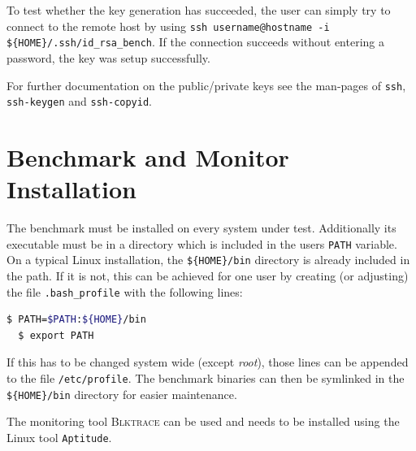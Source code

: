 To test whether the key generation has succeeded, the user can simply try to
connect to the remote host by using \texttt{ssh username@hostname -i \$\{HOME\}/.ssh/id\_rsa\_bench}. If the connection
succeeds without entering a password, the key was setup successfully.

For further documentation on the public/private keys see the man-pages of
\texttt{ssh}, \texttt{ssh-keygen} and \texttt{ssh-copyid}.
 
\section{Benchmark and Monitor Installation}
The benchmark must be installed on every system under test. Additionally its
executable must be in a directory which is included in the users \texttt{PATH}
variable. On a typical Linux installation, the \texttt{\$\{HOME\}/bin} directory
is already included in the path. If it is not, this can be achieved for one user 
by creating (or adjusting) the file \texttt{.bash\_profile} with the following 
lines: 
\begin{lstlisting}[language=bash]
  $ PATH=$PATH:${HOME}/bin
  $ export PATH
\end{lstlisting}
If this has to be changed system wide (except \emph{root}), those lines can be 
appended to the file \texttt{/etc/profile}.
The benchmark binaries can then be symlinked in the  \texttt{\$\{HOME\}/bin} 
directory for easier maintenance.

The monitoring tool \textsc{Blktrace} can be used and needs to be installed using the Linux tool \texttt{Aptitude}.

